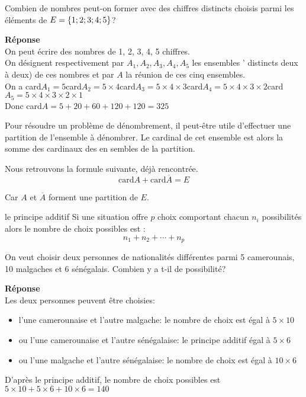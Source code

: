 \begin{exercice}
Combien de nombres peut-on former avec des chiffres distincts choisis parmi les éléments de  $ E=\left\{1;2;3;4;5\right\} $?
\end{exercice}
\textbf{Réponse}\\
On peut écrire des nombres de 1, 2, 3, 4, 5 chiffres.\\
On désignent respectivement par $ A_{1}, A_{2}, A_{3}, A_{4}, A_{5} $ les ensembles ' distincts deux à deux) de ces nombres et par $ A $ la réunion de ces cinq ensembles.\\
On a card$ A_{1}=5 $\quad card$ A_{2}=5 \times 4 $\quad card$ A_{3}=5 \times 4\times 3 $\quad card$ A_{4}=5 \times 4\times 3\times 2  $\quad card$ A_{5}=5 \times 4\times 3\times 2 \times 1 $\\
Donc card$ A = 5+20+60+120+120=325$
\begin{remark}
Pour résoudre un problème de dénombrement, il peut-être utile d'effectuer une partition de l'ensemble à dénombrer. Le cardinal de cet ensemble est alors la somme des cardinaux des en sembles de la partition.
\end{remark} 
\begin{property}
Nous retrouvons la formule suivante, déjà rencontrée.
\[\textrm{card}A +\textrm{card}\overline{A}= E \]

Car $ A $ et $\overline{A} $ forment une partition de $ E. $
\end{property}
\begin{corollary}{le principe additif}
Si une situation offre $ p $ choix comportant chacun $ n_{i} $ possibilités alors le nombre de choix possibles est :
\[n_{1}+ n_{2}+ \cdots + n_{p} \]
\end{corollary}
\begin{example}
On veut choisir deux personnes de nationalités différentes parmi 5 camerounais, 10 malgaches et 6 sénégalais.  Combien y a t-il de possibilité?
\end{example}
\textbf{Réponse}\\
Les deux personnes peuvent être choisies:
\begin{itemize}
\item l'une camerounaise et l'autre malgache:  le nombre de choix est égal à $ 5\times 10 $
\item  ou l'une camerounaise et l'autre sénégalaise: le principe additif égal à $ 5\times 6 $
\item ou l'une malgache et l'autre sénégalaise:  le nombre de choix est égal à $ 10\times 6 $
\end{itemize}
 D'après le principe additif, le nombre de choix possibles  est \\$ 5\times 10 +5\times 6 + 10\times 6 = 140$


